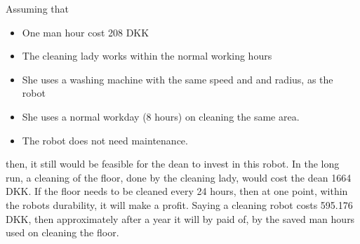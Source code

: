Assuming that 
\begin{itemize}\itemsep-2pt
\item One man hour cost 208 DKK 
\item The cleaning lady works within the normal working hours 
\item She uses a washing machine with the same speed and and radius, as the robot
\item She uses a normal workday (8 hours) on cleaning the same area.
\item The robot does not need maintenance.
\end{itemize}  
then, it still would be feasible for the dean to invest in this robot. In the long run, a cleaning of the floor, done by the cleaning lady, would cost the dean 1664 DKK. If the floor needs to be cleaned every 24 hours, then at one point, within the robots durability, it will make a profit. Saying a cleaning robot costs 595.176 DKK, then approximately after a year it will by paid of, by the saved man hours used on cleaning the floor. 